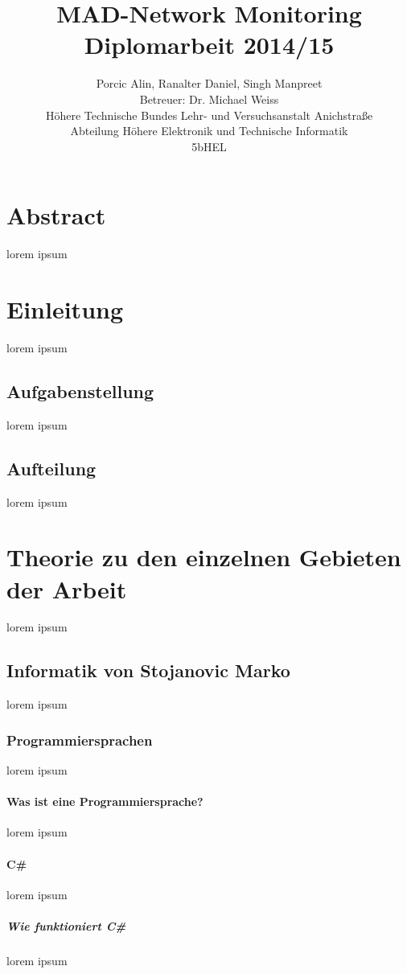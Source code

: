 \documentclass[12pt,a4paper]{report}
\title{MAD-Network Monitoring\\
Diplomarbeit 2014/15}
\author{Porcic Alin, Ranalter Daniel, Singh Manpreet\\
Betreuer: Dr. Michael Weiss\\
Höhere Technische Bundes Lehr- und Versuchsanstalt Anichstraße\\
Abteilung Höhere Elektronik und Technische Informatik\\
5bHEL}
\begin{document}
\maketitle
\newpage

\tableofcontents
\newpage

\pagestyle{fancy}

\chapter{Abstract}
\thispagestyle{fancy}

lorem ipsum

\chapter{Einleitung}
\thispagestyle{fancy}

lorem ipsum

\section{Aufgabenstellung}
lorem ipsum

\section{Aufteilung}
lorem ipsum 

\chapter{Theorie zu den einzelnen Gebieten der Arbeit}
lorem ipsum

\section{Informatik von Stojanovic Marko}
lorem ipsum

\subsection{Programmiersprachen}
lorem ipsum
\subsubsection{Was ist eine Programmiersprache?}
lorem ipsum
\subsubsection{C\#}
lorem ipsum
\paragraph{Wie funktioniert C\#}
lorem ipsum
\end{document}
